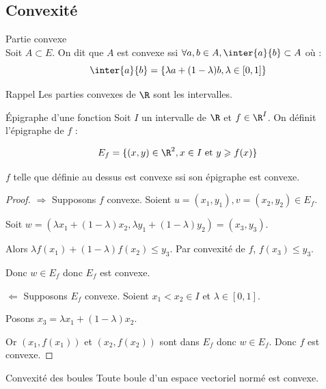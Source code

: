 \subsection{Convexité}

\begin{definition}{Partie convexe}{}
    \\Soit $A \subset E$. 
    On dit que $A$ est convexe ssi $\forall a, b \in A, \inter{a}{b} \subset A$ où :
    \[\inter{a}{b} = \{\lambda a + (1 - \lambda)b, \lambda \in [0, 1]\}\]
\end{definition}

\begin{theoreme}{Rappel}{}
    Les parties convexes de $\R$ sont les intervalles.
\end{theoreme}


\begin{definition}{Épigraphe d'une fonction}{}
    Soit $I$ un intervalle de $\R$ et $f \in \R^{I}$.
    On définit l'épigraphe de $f$ :

    \[ E_f = \{(x,y) \in \R^2, x \in I~\text{et}~y \geqslant f(x)\}\]     
\end{definition}

\begin{proposition}{}{}
    $f$ telle que définie au dessus est convexe ssi son épigraphe est convexe.
\end{proposition}

\begin{proof}
    $\Rightarrow$ Supposons $f$ convexe.
    Soient $u=(x_1,y_1), v=(x_2,y_2) \in E_f$.

    Soit $w = (\lambda x_1 + (1 - \lambda) x_2, \lambda y_1 + (1 - \lambda) y_2) = (x_3, y_3)$.

    Alors $\lambda f(x_1) + (1 - \lambda)f(x_2) \leqslant y_3$.
    Par convexité de $f$, $f(x_3) \leqslant y_3$.

    Donc $w \in E_f$ donc $E_f$ est convexe.

    $\Leftarrow$ Supposons $E_f$ convexe.
    Soient $x_1 < x_2 \in I$ et $\lambda \in [0,1]$.

    Posons $x_3 = \lambda x_1 + (1 - \lambda) x_2$.

    Or $(x_1,f(x_1))$ et $(x_2,f(x_2))$ sont dans $E_f$ donc $w \in E_f$. Donc $f$ est convexe.
\end{proof}

\begin{proposition}{Convexité des boules}{}
    Toute boule d'un espace vectoriel normé est convexe. 
\end{proposition}



